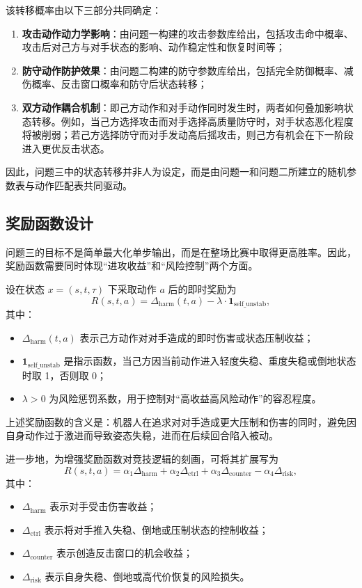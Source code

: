 该转移概率由以下三部分共同确定：
\begin{enumerate}
    \item \textbf{攻击动作动力学影响}：由问题一构建的攻击参数库给出，包括攻击命中概率、攻击后对己方与对手状态的影响、动作稳定性和恢复时间等；
    \item \textbf{防守动作防护效果}：由问题二构建的防守参数库给出，包括完全防御概率、减伤概率、反击窗口概率和防守后状态转移；
    \item \textbf{双方动作耦合机制}：即己方动作和对手动作同时发生时，两者如何叠加影响状态转移。例如，当己方选择攻击而对手选择高质量防守时，对手状态恶化程度将被削弱；若己方选择防守而对手发动高后摇攻击，则己方有机会在下一阶段进入更优反击状态。
\end{enumerate}

因此，问题三中的状态转移并非人为设定，而是由问题一和问题二所建立的随机参数表与动作匹配表共同驱动。

\subsection{奖励函数设计}

问题三的目标不是简单最大化单步输出，而是在整场比赛中取得更高胜率。因此，奖励函数需要同时体现“进攻收益”和“风险控制”两个方面。

设在状态 \(x=(s,t,\tau)\) 下采取动作 \(a\) 后的即时奖励为
\[
R(s,t,a)=\Delta_{\text{harm}}(t,a)-\lambda\cdot \mathbf{1}_{\text{self\_unstab}},
\]
其中：
\begin{itemize}
    \item \(\Delta_{\text{harm}}(t,a)\) 表示己方动作对对手造成的即时伤害或状态压制收益；
    \item \(\mathbf{1}_{\text{self\_unstab}}\) 是指示函数，当己方因当前动作进入轻度失稳、重度失稳或倒地状态时取 1，否则取 0；
    \item \(\lambda>0\) 为风险惩罚系数，用于控制对“高收益高风险动作”的容忍程度。
\end{itemize}

上述奖励函数的含义是：机器人在追求对对手造成更大压制和伤害的同时，避免因自身动作过于激进而导致姿态失稳，进而在后续回合陷入被动。

进一步地，为增强奖励函数对竞技逻辑的刻画，可将其扩展写为
\[
R(s,t,a)
=
\alpha_1 \Delta_{\text{harm}}
+\alpha_2 \Delta_{\text{ctrl}}
+\alpha_3 \Delta_{\text{counter}}
-\alpha_4 \Delta_{\text{risk}},
\]
其中：
\begin{itemize}
    \item \(\Delta_{\text{harm}}\) 表示对手受击伤害收益；
    \item \(\Delta_{\text{ctrl}}\) 表示将对手推入失稳、倒地或压制状态的控制收益；
    \item \(\Delta_{\text{counter}}\) 表示创造反击窗口的机会收益；
    \item \(\Delta_{\text{risk}}\) 表示自身失稳、倒地或高代价恢复的风险损失。
\end{itemize}

